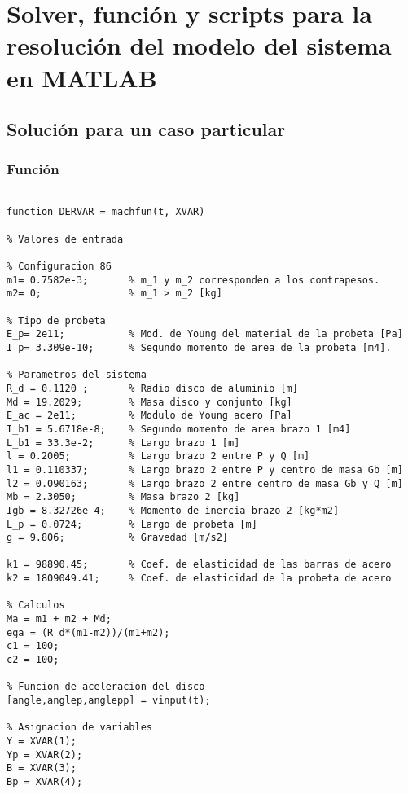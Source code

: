 %
\chapter{Solver, función y scripts para la resolución del modelo del sistema en MATLAB}
\label{ch:anexo_c}

\section{Solución para un caso particular}
\label{sec:sol_part}

\subsection{Función}

\begin{lstlisting}

function DERVAR = machfun(t, XVAR)

% Valores de entrada

% Configuracion 86
m1= 0.7582e-3;       % m_1 y m_2 corresponden a los contrapesos.
m2= 0;               % m_1 > m_2 [kg]

% Tipo de probeta
E_p= 2e11;           % Mod. de Young del material de la probeta [Pa]
I_p= 3.309e-10;      % Segundo momento de area de la probeta [m4].

% Parametros del sistema
R_d = 0.1120 ;       % Radio disco de aluminio [m]
Md = 19.2029;        % Masa disco y conjunto [kg]
E_ac = 2e11;         % Modulo de Young acero [Pa]
I_b1 = 5.6718e-8;    % Segundo momento de area brazo 1 [m4]
L_b1 = 33.3e-2;      % Largo brazo 1 [m]
l = 0.2005;          % Largo brazo 2 entre P y Q [m]
l1 = 0.110337;       % Largo brazo 2 entre P y centro de masa Gb [m]
l2 = 0.090163;       % Largo brazo 2 entre centro de masa Gb y Q [m]
Mb = 2.3050;         % Masa brazo 2 [kg]
Igb = 8.32726e-4;    % Momento de inercia brazo 2 [kg*m2]
L_p = 0.0724;        % Largo de probeta [m]
g = 9.806;           % Gravedad [m/s2]

k1 = 98890.45;       % Coef. de elasticidad de las barras de acero
k2 = 1809049.41;     % Coef. de elasticidad de la probeta de acero

% Calculos
Ma = m1 + m2 + Md;
ega = (R_d*(m1-m2))/(m1+m2);
c1 = 100;
c2 = 100;

% Funcion de aceleracion del disco
[angle,anglep,anglepp] = vinput(t);

% Asignacion de variables
Y = XVAR(1);
Yp = XVAR(2);
B = XVAR(3);
Bp = XVAR(4);


\end{lstlisting}
